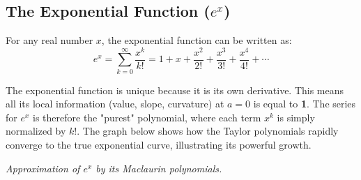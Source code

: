\subsection{The Exponential Function ($e^x$)}

\begin{theorembox}
For any real number $x$, the exponential function can be written as:
$$ e^x = \sum_{k=0}^{\infty} \frac{x^k}{k!} = 1 + x + \frac{x^2}{2!} + \frac{x^3}{3!} + \frac{x^4}{4!} + \cdots $$
\end{theorembox}

\begin{intuitionbox}
The exponential function is unique because it is its own derivative. This means all its local information (value, slope, curvature) at $a=0$ is equal to \textbf{1}. The series for $e^x$ is therefore the "purest" polynomial, where each term $x^k$ is simply normalized by $k!$. The graph below shows how the Taylor polynomials rapidly converge to the true exponential curve, illustrating its powerful growth.

\tcblower

\centering
{}
\par\small\textit{Approximation of $e^x$ by its Maclaurin polynomials.}
\end{intuitionbox}

